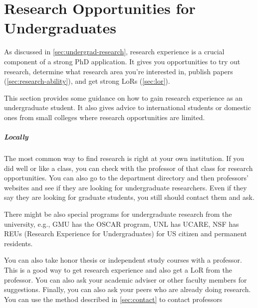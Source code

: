 \documentclass[oneside,11pt]{book}
\newenvironment{domesticbox}[1][]{
  \small
  \begin{mydomesticbox}
    {\small \textbf{#1}}
  }{
  \end{mydomesticbox}
}
\begin{document}

\chapter{Research Opportunities for Undergraduates}\label{sec:undergrad-research}


As discussed in \autoref{sec:undergrad-research}, research experience is a crucial component of a strong PhD application. It gives you opportunities to try out research, determine what research area you're interested in, publish papers (\autoref{sec:research-ability}), and get strong LoRs (\autoref{sec:lor}). 

 This section provides some guidance on how to gain research experience as an undergraduate student.  It also gives advice to international students or domestic ones from small colleges where research opportunities are limited.

\paragraph{Locally} The most common way to find research is right at your own institution.  
If you did well or like a class, you can check with the professor of that class for research opportunities.  
You can also go to the department directory and then professors' websites and see if they are looking for undergraduate researchers.
Even if they say they are looking for graduate students, you still should contact them and ask.  

There might be also special programs for undergraduate research from the university, e.g., GMU has the OSCAR program, UNL has UCARE, NSF has REUs (Research Experience for Undergraduates) for US citizen and permanent residents. 

You can also take honor thesis or independent study courses with a professor.  This is a good way to get research experience and also get a LoR from the professor.  You can also ask your academic adviser or other faculty members for suggestions.  Finally, you can also ask your peers who are already doing research.  You can use the method described in \autoref{sec:contact} to contact professors
\end{document}
